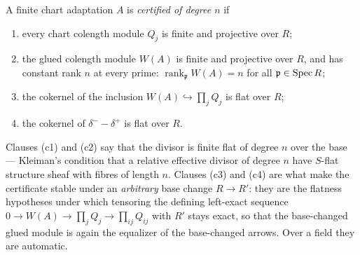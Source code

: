 \begin{definition}
  \label{pa-def:isCertified}
  \leanok

  A finite chart adaptation \(A\) is \emph{certified of degree \(n\)} if
  \begin{enumerate}
    \item[(c1)] every chart colength module \(Q_j\) is finite and projective over \(R\);
    \item[(c2)] the glued colength module \(W(A)\) is finite and projective over \(R\), and
      has constant rank \(n\) at every prime: \(\operatorname{rank}_{\mathfrak p} W(A) = n\)
      for all \(\mathfrak p \in \operatorname{Spec} R\);
    \item[(c3)] the cokernel of the inclusion \(W(A) \hookrightarrow \prod_j Q_j\) is flat
      over \(R\);
    \item[(c4)] the cokernel of \(\delta^- - \delta^+\) is flat over \(R\).
  \end{enumerate}
  Clauses (c1) and (c2) say that the divisor is finite flat of degree \(n\) over the base
  --- Kleiman's condition that a relative effective divisor of degree \(n\) have
  \(S\)-flat structure sheaf with fibres of length \(n\). Clauses (c3) and (c4) are what
  make the certificate stable under an \emph{arbitrary} base change \(R \to R'\): they are
  the flatness hypotheses under which tensoring the defining left-exact sequence
  \(0 \to W(A) \to \prod_j Q_j \to \prod_{ij} Q_{ij}\) with \(R'\) stays exact, so that the
  base-changed glued module is again the equalizer of the base-changed arrows. Over a field
  they are automatic.
\end{definition}

